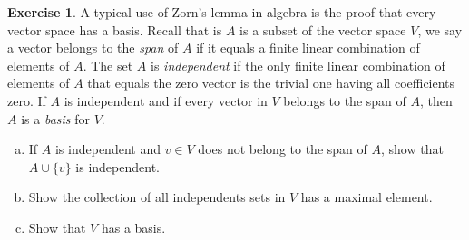 \documentclass[11pt,a4paper,twoside]{article}
\theoremstyle{definition}
\newcounter{excounter}
\newtheorem{exercise}[excounter]{Exercise}
\begin{document}
\begin{exercise}

  A typical use of Zorn's lemma in algebra is the proof that every vector space
  has a basis. Recall that is $A$ is a subset of the vector space $V$, we say
  a vector belongs to the \emph{span} of $A$ if it equals a finite linear combination
  of elements of $A$. The set $A$ is \emph{independent} if the only finite linear
  combination of elements of $A$ that equals the zero vector is the trivial one having
  all coefficients zero. If $A$ is independent and if every vector in $V$ belongs to
  the span of $A$, then $A$ is a \emph{basis} for $V$.
  \begin{enumerate}[(a)]

  \item If $A$ is independent and $v \in V$ does not belong to the span of $A$,
    show that $A \cup \{ v \}$ is independent.

  \item Show the collection of all independents sets in $V$ has a maximal element.

  \item Show that $V$ has a basis.

  \end{enumerate}

\end{exercise}
\end{document}
